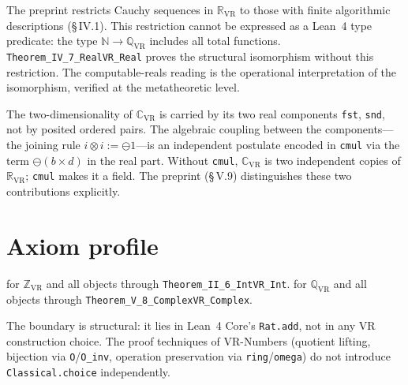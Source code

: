 \begin{remark}
\label{rem:computable_reals}
\leanok
{}
The preprint restricts Cauchy sequences in $\mathbb{R}_{\mathrm{VR}}$ to those
with finite algorithmic descriptions (§\,IV.1).  This restriction cannot be
expressed as a Lean~4 type predicate: the type $\mathbb{N} \to
\mathbb{Q}_{\mathrm{VR}}$ includes all total functions.
\texttt{Theorem\_IV\_7\_RealVR\_Real} proves the structural isomorphism
without this restriction.  The computable-reals reading is the operational
interpretation of the isomorphism, verified at the metatheoretic level.
\end{remark}

\begin{remark}
\label{rem:complex_two_things}
\leanok
{}
The two-dimensionality of $\mathbb{C}_{\mathrm{VR}}$ is carried by its two
real components \texttt{fst}, \texttt{snd}, not by posited ordered pairs.
The algebraic coupling between the components---the joining rule
$i \otimes i := \ominus 1$---is an independent postulate encoded in
\texttt{cmul} via the term $\ominus(b \times d)$ in the real part.
Without \texttt{cmul}, $\mathbb{C}_{\mathrm{VR}}$ is two independent copies
of $\mathbb{R}_{\mathrm{VR}}$; \texttt{cmul} makes it a field.
The preprint (§\,V.9) distinguishes these two contributions explicitly.
\end{remark}

\section{Axiom profile}
\label{sec:numbers_axiom_profile}

 for $\mathbb{Z}_{\mathrm{VR}}$ and all
objects through \texttt{Theorem\_II\_6\_IntVR\_Int}.
 for $\mathbb{Q}_{\mathrm{VR}}$
and all objects through \texttt{Theorem\_V\_8\_ComplexVR\_Complex}.

The boundary is structural: it lies in Lean~4 Core's \texttt{Rat.add}, not in
any VR construction choice.  The proof techniques of VR-Numbers (quotient
lifting, bijection via \texttt{O}/\texttt{O\_inv}, operation preservation via
\texttt{ring}/\texttt{omega}) do not introduce \texttt{Classical.choice}
independently.

